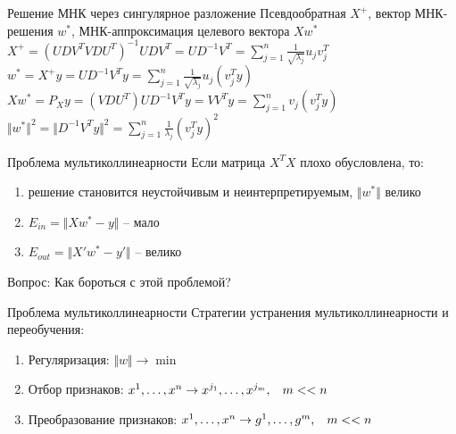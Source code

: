 \documentclass[10pt]{beamer}
\begin{document}
\begin{frame}{Решение МНК через сингулярное разложение}
	Псевдообратная $X^+$, вектор МНК-решения $w^*$,
	МНК-аппроксимация целевого вектора $Xw^*$\\
	\bigbreak
	\pause
	$X^+ = (UDV^TVDU^T)^{-1}UDV^T = UD^{-1}V^T = \sum\limits_{j=1}^n \frac{1}{\sqrt{\lambda_j}}  u_j v_j^T$\\
	\pause
	$ w^* = X^+y = UD^{-1}V^Ty = \sum\limits_{j=1}^n \frac{1}{\sqrt{\lambda_j}}  u_j (v_j^Ty)$\\
	\pause
	$X w^* = P_X y = (VDU^T)UD^{-1}V^Ty = VV^Ty = \sum\limits_{j=1}^n v_j (v_j^Ty)$\\
	\pause
	$\Vert w^* \Vert^2  = \Vert D^{-1}V^Ty \Vert^2 = \sum\limits_{j=1}^n \frac{1}{\lambda_j} (v_j^Ty)^2$
\end{frame}


\begin{frame}{Проблема мультиколлинеарности}
	Если матрица $X^TX$ плохо обусловлена, то: 
	\begin{enumerate}[--]
		\item решение становится неустойчивым и неинтерпретируемым, $\Vert w^* \Vert $ велико
		\item $E_{in} = \Vert Xw^* -y \Vert$ -- мало   
		\item $E_{out} = \Vert X'w^* -y' \Vert$ -- велико
	\end{enumerate}
	\bigbreak
	\pause
	\alert{Вопрос:} Как бороться с этой проблемой?
\end{frame}

\begin{frame}{Проблема мультиколлинеарности}
	Стратегии устранения мультиколлинеарности и переобучения:
	\begin{enumerate}[--]
		\item Регуляризация: $\Vert w \Vert \rightarrow \min$
		\item Отбор признаков: $x^1, \dots, x^n \rightarrow x^{j_1}, \dots, x^{j_m}, \hspace{3mm} m << n$
		\item Преобразование признаков: $x^1, \dots, x^n \rightarrow g^1, \dots, g^m,\hspace{3mm}  m << n$
	\end{enumerate}
\end{frame}
\end{document}
